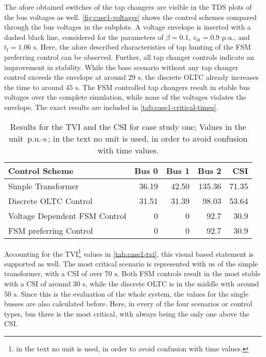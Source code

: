 The afore obtained switches of the tap changers are visible in the \acs{TDS} plots of the bus voltages as well.
\autoref{fig:case1-voltages} shows the control schemes compared through the bus voltages in the subplots.
A voltage envelope is inserted with a dashed black line, considered for the parameters of $\beta=0.1$,  $v_\mathrm{st}=0.9\text{ p.u.}$, and $t_\mathrm{f}=1.06\text{ s}$.
Here, the afore described characteristics of tap hunting of the \acs{FSM} preferring control can be observed.
Further, all tap changer controls indicate an improvement in stability.
While the base scenario without any tap changer control exceeds the envelope at around $29\text{ s}$, the discrete \acs{OLTC} already increases the time to around $45\text{ s}$. 
The \acs{FSM} controlled tap changers result in stable bus voltages over the complete simulation, while none of the voltages violates the envelope.
The exact results are included in \autoref{tab:case1-critical-times}.

\begin{table}[htbp!]
    \caption[Results for the \acs{TVI} and the \acs{CSI} for case study one]{Results for the \acs{TVI} and the \acs{CSI} for case study one; Values in the unit $\text{p.u.} \cdot \text{s}$; in the text no unit is used, in order to avoid confusion with time values.}
    \label{tab:case1-tvi}
    \vspace*{12pt}
    \centering
    \small
    \begin{tabularx}{\textwidth}{Xrrrr}
        \textbf{Control Scheme} & \textbf{Bus 0} & \textbf{Bus 1} & \textbf{Bus 2} & \textbf{\acs{CSI}} \\ \hline
        \toprule
        Simple Transformer                  & 36.19 & 42.50 & 135.36 & 71.35 \\
        Discrete \acs{OLTC} Control         & 31.51 & 31.39 & 98.03 & 53.64 \\
        Voltage Dependent \acs{FSM} Control & 0 & 0 & 92.7 & 30.9 \\
        \acs{FSM} preferring Control        & 0 & 0 & 92.7 & 30.9 \\
        \bottomrule
    \end{tabularx}
\end{table}

Accounting for the \acs{TVI}\footnote{in the text no unit is used, in order to avoid confusion with time values.} values in \autoref{tab:case1-tvi}, this visual based statement is supported as well.
The most critical scenario is represented with us of the simple transformer, with a \acs{CSI} of over $70\text{ s}$.
Both \acs{FSM} controls result in the most stable with a \acs{CSI} of around $30\text{ s}$, while the discrete \acs{OLTC} is in the middle with around $50\text{ s}$.
Since this is the evaluation of the whole system, the values for the single busses are also calculated before.
Here, in every of the four scenarios or control types, bus three is the most critical, with always being the only one above the \acs{CSI}.

